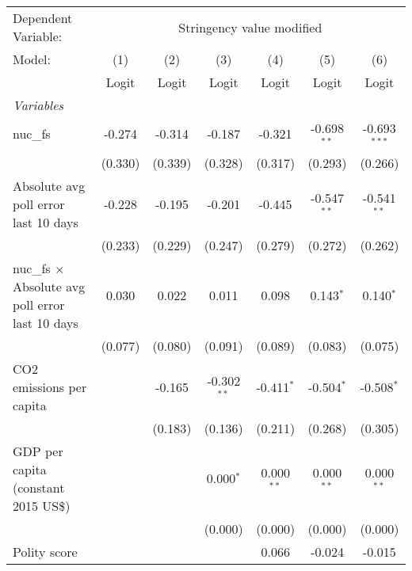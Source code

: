 
\begingroup
\centering
\begin{tabular}{lcccccc}
   \toprule
   Dependent Variable: & \multicolumn{6}{c}{Stringency value modified}\\
   Model:                                                  & (1)     & (2)     & (3)           & (4)          & (5)           & (6)\\  
                                                           &  Logit  & Logit   & Logit         & Logit        & Logit         & Logit\\  
   \midrule
   \emph{Variables}\\
   nuc\_fs                                                 & -0.274  & -0.314  & -0.187        & -0.321       & -0.698$^{**}$ & -0.693$^{***}$\\   
                                                           & (0.330) & (0.339) & (0.328)       & (0.317)      & (0.293)       & (0.266)\\   
   Absolute avg poll error last 10 days                    & -0.228  & -0.195  & -0.201        & -0.445       & -0.547$^{**}$ & -0.541$^{**}$\\   
                                                           & (0.233) & (0.229) & (0.247)       & (0.279)      & (0.272)       & (0.262)\\   
   nuc\_fs $\times$ Absolute avg poll error last 10 days   & 0.030   & 0.022   & 0.011         & 0.098        & 0.143$^{*}$   & 0.140$^{*}$\\   
                                                           & (0.077) & (0.080) & (0.091)       & (0.089)      & (0.083)       & (0.075)\\   
   CO2 emissions per capita                                &         & -0.165  & -0.302$^{**}$ & -0.411$^{*}$ & -0.504$^{*}$  & -0.508$^{*}$\\   
                                                           &         & (0.183) & (0.136)       & (0.211)      & (0.268)       & (0.305)\\   
   GDP per capita (constant 2015 US\$)                     &         &         & 0.000$^{*}$   & 0.000$^{**}$ & 0.000$^{**}$  & 0.000$^{**}$\\   
                                                           &         &         & (0.000)       & (0.000)      & (0.000)       & (0.000)\\   
   Polity score                                            &         &         &               & 0.066        & -0.024        & -0.015\\   

\end{tabular}
